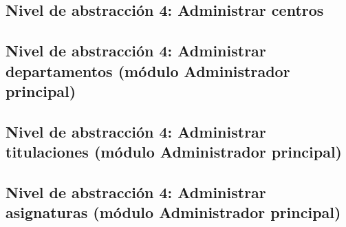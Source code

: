 \subsection{Nivel de abstracción 4: Administrar centros}



\subsection{Nivel de abstracción 4: Administrar departamentos (módulo Administrador principal)}



\subsection{Nivel de abstracción 4: Administrar titulaciones (\-mó\-dulo Administrador principal)}



\subsection{Nivel de abstracción 4: Administrar asignaturas (\-mó\-dulo Administrador principal)}

